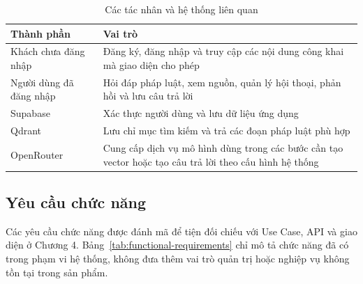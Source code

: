 \documentclass[12pt,a4paper,oneside]{report}
\begin{document}
\begin{table}[H]
  \caption{Các tác nhân và hệ thống liên quan}
  \label{tab:actors}
  \centering
  \begin{tabularx}{\textwidth}{|L{3.6cm}|Y|}
    \hline
    \textbf{Thành phần}     & \textbf{Vai trò}                                                                                        \\
    \hline
    Khách chưa đăng nhập    & Đăng ký, đăng nhập và truy cập các nội dung công khai mà giao diện cho phép                             \\
    \hline
    Người dùng đã đăng nhập & Hỏi đáp pháp luật, xem nguồn, quản lý hội thoại, phản hồi và lưu câu trả lời                            \\
    \hline
    Supabase                & Xác thực người dùng và lưu dữ liệu ứng dụng                                                             \\
    \hline
    Qdrant                  & Lưu chỉ mục tìm kiếm và trả các đoạn pháp luật phù hợp                                                  \\
    \hline
    OpenRouter              & Cung cấp dịch vụ mô hình dùng trong các bước cần tạo vector hoặc tạo câu trả lời theo cấu hình hệ thống \\
    \hline
  \end{tabularx}
\end{table}

\subsection{Yêu cầu chức năng}
Các yêu cầu chức năng được đánh mã để tiện đối chiếu với Use Case, API và giao diện ở Chương 4. Bảng~\ref{tab:functional-requirements} chỉ mô tả chức năng đã có trong phạm vi hệ thống, không đưa thêm vai trò quản trị hoặc nghiệp vụ không tồn tại trong sản phẩm.
\end{document}
